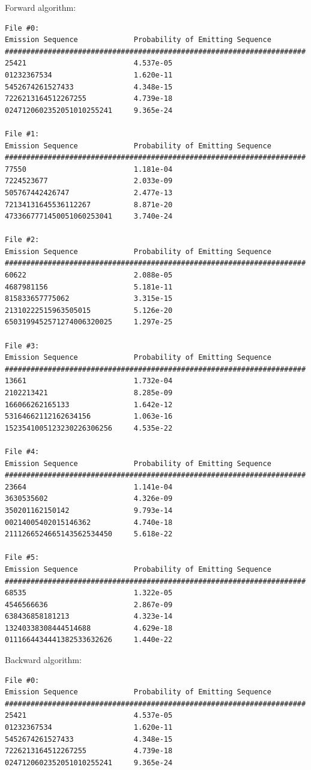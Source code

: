 \begin{solution}
  Forward algorithm:
  \begin{verbatim}
File #0:
Emission Sequence             Probability of Emitting Sequence
######################################################################
25421                         4.537e-05 
01232367534                   1.620e-11 
5452674261527433              4.348e-15 
7226213164512267255           4.739e-18 
0247120602352051010255241     9.365e-24 

File #1:
Emission Sequence             Probability of Emitting Sequence
######################################################################
77550                         1.181e-04 
7224523677                    2.033e-09 
505767442426747               2.477e-13 
72134131645536112267          8.871e-20 
4733667771450051060253041     3.740e-24 

File #2:
Emission Sequence             Probability of Emitting Sequence
######################################################################
60622                         2.088e-05 
4687981156                    5.181e-11 
815833657775062               3.315e-15 
21310222515963505015          5.126e-20 
6503199452571274006320025     1.297e-25 

File #3:
Emission Sequence             Probability of Emitting Sequence
######################################################################
13661                         1.732e-04 
2102213421                    8.285e-09 
166066262165133               1.642e-12 
53164662112162634156          1.063e-16 
1523541005123230226306256     4.535e-22 

File #4:
Emission Sequence             Probability of Emitting Sequence
######################################################################
23664                         1.141e-04 
3630535602                    4.326e-09 
350201162150142               9.793e-14 
00214005402015146362          4.740e-18 
2111266524665143562534450     5.618e-22 

File #5:
Emission Sequence             Probability of Emitting Sequence
######################################################################
68535                         1.322e-05 
4546566636                    2.867e-09 
638436858181213               4.323e-14 
13240338308444514688          4.629e-18 
0111664434441382533632626     1.440e-22 
  \end{verbatim}

  Backward algorithm:
  \begin{verbatim}
File #0:
Emission Sequence             Probability of Emitting Sequence
######################################################################
25421                         4.537e-05 
01232367534                   1.620e-11 
5452674261527433              4.348e-15 
7226213164512267255           4.739e-18 
0247120602352051010255241     9.365e-24 


\end{verbatim}
\end{solution}
